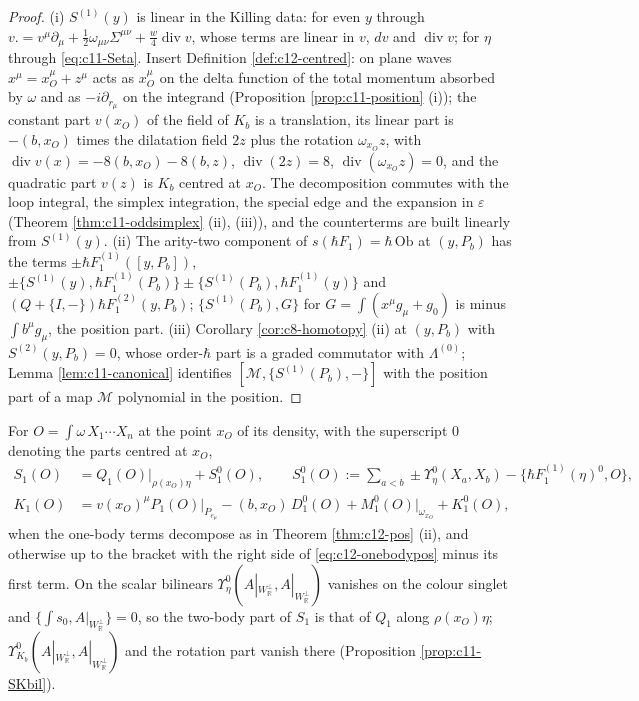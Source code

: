 \begin{proof}
(i) $S^{(1)}(y)$ is linear in the Killing data: for even $y$ through $v.=v^\mu\partial_\mu+\tfrac12\omega_{\mu\nu}\Sigma^{\mu\nu}+\tfrac w4\operatorname{div}v$, whose terms are linear in $v$, $dv$ and $\operatorname{div}v$; for $\eta$ through \eqref{eq:c11-Seta}. Insert Definition \ref{def:c12-centred}: on plane waves $x^\mu=x_O^\mu+z^\mu$ acts as $x_O^\mu$ on the delta function of the total momentum absorbed by $\omega$ and as $-i\partial_{r_\mu}$ on the integrand (Proposition \ref{prop:c11-position} (i)); the constant part $v(x_O)$ of the field of $K_b$ is a translation, its linear part is $-(b,x_O)$ times the dilatation field $2z$ plus the rotation $\omega_{x_O}z$, with $\operatorname{div}v(x)=-8(b,x_O)-8(b,z)$, $\operatorname{div}(2z)=8$, $\operatorname{div}(\omega_{x_O}z)=0$, and the quadratic part $v(z)$ is $K_b$ centred at $x_O$. The decomposition commutes with the loop integral, the simplex integration, the special edge and the expansion in $\varepsilon$ (Theorem \ref{thm:c11-oddsimplex} (ii), (iii)), and the counterterms are built linearly from $S^{(1)}(y)$. (ii) The arity-two component of $s(\hbar F_1)=\hbar\,\mathrm{Ob}$ at $(y,P_b)$ has the terms $\pm\hbar F_1^{(1)}([y,P_b])$, $\pm\{S^{(1)}(y),\hbar F_1^{(1)}(P_b)\}\pm\{S^{(1)}(P_b),\hbar F_1^{(1)}(y)\}$ and $(Q+\{I,-\})\hbar F_1^{(2)}(y,P_b)$; $\{S^{(1)}(P_b),G\}$ for $G=\int(x^\mu g_\mu+g_0)$ is minus $\int b^\mu g_\mu$, the position part. (iii) Corollary \ref{cor:c8-homotopy} (ii) at $(y,P_b)$ with $S^{(2)}(y,P_b)=0$, whose order-$\hbar$ part is a graded commutator with $\Lambda^{(0)}$; Lemma \ref{lem:c11-canonical} identifies $[\mathcal M,\{S^{(1)}(P_b),-\}]$ with the position part of a map $\mathcal M$ polynomial in the position.
\end{proof}

\begin{corollary}
\label{cor:c12-SK}
For $O=\int\omega\,X_1\cdots X_n$ at the point $x_O$ of its density, with the superscript $0$ denoting the parts centred at $x_O$,
\begin{equation}
\begin{aligned}
S_1(O)&=Q_1(O)\big|_{\rho(x_O)\eta}+S^0_1(O),\qquad S^0_1(O):=\sum_{a<b}\pm\Upsilon^0_\eta(X_a,X_b)-\big\{\hbar F_1^{(1)}(\eta)^0,O\big\},\\
K_1(O)&=v(x_O)^\mu P_1(O)\big|_{P_{e_\mu}}-(b,x_O)\,D^0_1(O)+M^0_1(O)\big|_{\omega_{x_O}}+K^0_1(O),
\end{aligned}
\label{eq:c12-SK}
\end{equation}
when the one-body terms decompose as in Theorem \ref{thm:c12-pos} (ii), and otherwise up to the bracket with the right side of \eqref{eq:c12-onebodypos} minus its first term. On the scalar bilinears $\Upsilon^0_\eta(A|_{W_{\mathbb R}^\perp},A|_{W_{\mathbb R}^\perp})$ vanishes on the colour singlet and $\{\int s_0,A|_{W_{\mathbb R}^\perp}\}=0$, so the two-body part of $S_1$ is that of $Q_1$ along $\rho(x_O)\eta$; $\Upsilon^0_{K_b}(A|_{W_{\mathbb R}^\perp},A|_{W_{\mathbb R}^\perp})$ and the rotation part vanish there (Proposition \ref{prop:c11-SKbil}).
\end{corollary}


